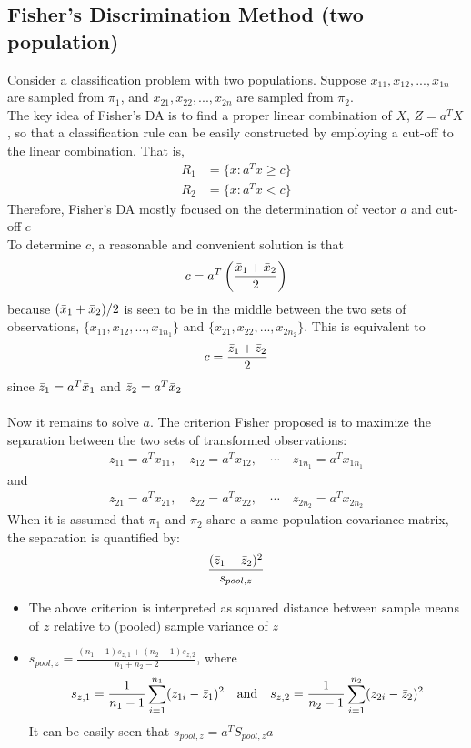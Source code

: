 \documentclass[12pt]{extarticle}
\newcommand{\<}{\langle}
\renewcommand{\>}{\rangle}
\theoremstyle{definition}
\begin{document}
\newpage
\subsection{Fisher's Discrimination Method (two population)}
Consider a classification problem with two populations. Suppose $x_{11},x_{12},...,x_{1n}$ are sampled from $\pi_1$, and $x_{21},x_{22},...,x_{2n}$ are sampled from $\pi_2$.\\
The key idea of Fisher's DA is to find a proper linear combination of $X$, $Z=a^T X$, so that a classification rule can be easily constructed by employing a cut-off to the linear combination. That is,
\begin{align*}
    R_1 &= \{x: a^T x \geq c \}\\
    R_2 &= \{x: a^T x < c \}
\end{align*}
Therefore, Fisher's DA mostly focused on the determination of vector $a$ and cut-off $c$\\
To determine $c$, a reasonable and convenient solution is that
\begin{align*}
    c = a^T \left( \frac{\Bar{x}_1 +\Bar{x}_2}{2}\right)
\end{align*}
because $(\Bar{x}_1 +\Bar{x}_2)/2$ is seen to be in the middle between the two sets of observations, $\{x_{11},x_{12},...,x_{1n_1}\}$ and $\{x_{21},x_{22},...,x_{2n_2}\}$. This is equivalent to
\begin{align*}
    c = \frac{\Bar{z}_1 +\Bar{z}_2}{2}
\end{align*}
since $\Bar{z}_1 =a^T \Bar{x}_1$ and $\Bar{z}_2 =a^T \Bar{x}_2$\\
\ \\
Now it remains to solve $a$. The criterion Fisher proposed is to maximize the separation between the two sets of transformed observations:
\begin{align*}
    z_{11} = a^T x_{11}, \quad z_{12} = a^T x_{12}, \quad \cdots \quad z_{1n_1} = a^T x_{1n_1}
\end{align*}
and
\begin{align*}
    z_{21} = a^T x_{21}, \quad z_{22} = a^T x_{22}, \quad \cdots \quad z_{2n_2} = a^T x_{2n_2}
\end{align*}
When it is assumed that $\pi_1$ and $\pi_2$ share a same population covariance matrix, the separation is quantified by:
\begin{align*}
    \frac{(\Bar{z}_1 -\Bar{z}_2)^2}{s_{pool,z}}
\end{align*}
\begin{itemize}
    \item The above criterion is interpreted as squared distance between sample means of $z$ relative to (pooled) sample variance of $z$
    \item $s_{pool,z} =\frac{(n_1 -1)s_{z,1} +(n_2 -1)s_{z,2}}{n_1 +n_2 -2}$, where
    \begin{align*}
        s_{z,1} =\frac{1}{n_1 -1}\sum^{n_1}_{i=1}(z_{1i}-\Bar{z}_1)^2 \quad \text{and} \quad s_{z,2} =\frac{1}{n_2 -1}\sum^{n_2}_{i=1}(z_{2i}-\Bar{z}_2)^2
    \end{align*}
    It can be easily seen that $s_{pool,z} =a^T S_{pool,z} a$
\end{itemize}
\end{document}
